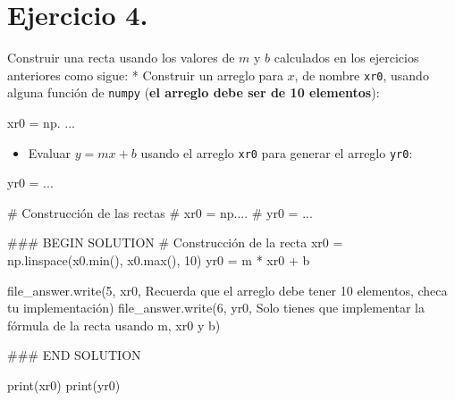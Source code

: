 \documentclass[
  letterpaper,
  DIV=11,
  numbers=noendperiod]{scrreprt}
\newenvironment{Shaded}{\begin{snugshade}}{\end{snugshade}}
\newcommand{\BuiltInTok}[1]{\textcolor[rgb]{0.00,0.23,0.31}{#1}}
\newcommand{\CommentTok}[1]{\textcolor[rgb]{0.37,0.37,0.37}{#1}}
\newcommand{\DecValTok}[1]{\textcolor[rgb]{0.68,0.00,0.00}{#1}}
\newcommand{\NormalTok}[1]{\textcolor[rgb]{0.00,0.23,0.31}{#1}}
\newcommand{\OperatorTok}[1]{\textcolor[rgb]{0.37,0.37,0.37}{#1}}
\newcommand{\RegionMarkerTok}[1]{\textcolor[rgb]{0.00,0.23,0.31}{#1}}
\newcommand{\StringTok}[1]{\textcolor[rgb]{0.13,0.47,0.30}{#1}}
\providecommand{\tightlist}{%
  \setlength{\itemsep}{0pt}\setlength{\parskip}{0pt}}\usepackage{longtable,booktabs,array}
\begin{document}
\section{\texorpdfstring{\textbf{Ejercicio
4.}}{Ejercicio 4.}}\label{ejercicio-4.}

Construir una recta usando los valores de \(m\) y \(b\) calculados en
los ejercicios anteriores como sigue: * Construir un arreglo para \(x\),
de nombre \texttt{xr0}, usando alguna función de \texttt{numpy}
(\textbf{el arreglo debe ser de 10 elementos}):

\begin{Shaded}
\begin{Highlighting}[]
\NormalTok{xr0 }\OperatorTok{=}\NormalTok{ np. ...}
\end{Highlighting}
\end{Shaded}

\begin{itemize}
\tightlist
\item
  Evaluar \(y = mx + b\) usando el arreglo \texttt{xr0} para generar el
  arreglo \texttt{yr0}:
\end{itemize}

\begin{Shaded}
\begin{Highlighting}[]
\NormalTok{yr0 }\OperatorTok{=}\NormalTok{ ...}
\end{Highlighting}
\end{Shaded}

\begin{Shaded}
\begin{Highlighting}[]
\CommentTok{\# Construcción de las rectas}
\CommentTok{\# xr0 = np....}
\CommentTok{\# yr0 = ...}

\CommentTok{\#\#\# }\RegionMarkerTok{BEGIN}\CommentTok{ SOLUTION}
\CommentTok{\# Construcción de la recta}
\NormalTok{xr0 }\OperatorTok{=}\NormalTok{ np.linspace(x0.}\BuiltInTok{min}\NormalTok{(), x0.}\BuiltInTok{max}\NormalTok{(), }\DecValTok{10}\NormalTok{)}
\NormalTok{yr0 }\OperatorTok{=}\NormalTok{ m }\OperatorTok{*}\NormalTok{ xr0 }\OperatorTok{+}\NormalTok{ b}

\NormalTok{file\_answer.write(}\StringTok{\textquotesingle{}5\textquotesingle{}}\NormalTok{, xr0, }\StringTok{\textquotesingle{}Recuerda que el arreglo debe tener 10 elementos, checa tu implementación\textquotesingle{}}\NormalTok{)}
\NormalTok{file\_answer.write(}\StringTok{\textquotesingle{}6\textquotesingle{}}\NormalTok{, yr0, }\StringTok{\textquotesingle{}Solo tienes que implementar la fórmula de la recta usando m, xr0 y b\textquotesingle{}}\NormalTok{)}

\CommentTok{\#\#\# }\RegionMarkerTok{END}\CommentTok{ SOLUTION}

\BuiltInTok{print}\NormalTok{(xr0)}
\BuiltInTok{print}\NormalTok{(yr0)}
\end{Highlighting}
\end{Shaded}
\end{document}
